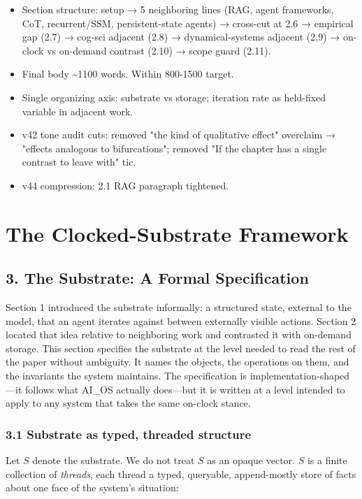 \documentclass[11pt,letterpaper]{article}
\begin{document}
\begin{itemize}
  \item Section structure: setup → 5 neighboring lines (RAG, agent frameworks, CoT, recurrent/SSM, persistent-state agents) → cross-cut at 2.6 → empirical gap (2.7) → cog-sci adjacent (2.8) → dynamical-systems adjacent (2.9) → on-clock vs on-demand contrast (2.10) → scope guard (2.11).
  \item Final body \textasciitilde{}1100 words. Within 800-1500 target.
  \item Single organizing axis: substrate vs storage; iteration rate as held-fixed variable in adjacent work.
  \item v42 tone audit cuts: removed "the kind of qualitative effect" overclaim → "effects analogous to bifurcations"; removed "If the chapter has a single contrast to leave with" tic.
  \item v44 compression: 2.1 RAG paragraph tightened.
\end{itemize}

\section{The Clocked-Substrate Framework}
\subsection*{3. The Substrate: A Formal Specification}

Section 1 introduced the substrate informally: a structured state, external to the model, that an agent iterates against between externally visible actions. Section 2 located that idea relative to neighboring work and contrasted it with on-demand storage. This section specifies the substrate at the level needed to read the rest of the paper without ambiguity. It names the objects, the operations on them, and the invariants the system maintains. The specification is implementation-shaped---it follows what AI\_OS actually does---but it is written at a level intended to apply to any system that takes the same on-clock stance.

\subsubsection*{3.1 Substrate as typed, threaded structure}

Let $S$ denote the substrate. We do not treat $S$ as an opaque vector. $S$ is a finite collection of \emph{threads}, each thread a typed, queryable, append-mostly store of facts about one face of the system's situation:
\end{document}
